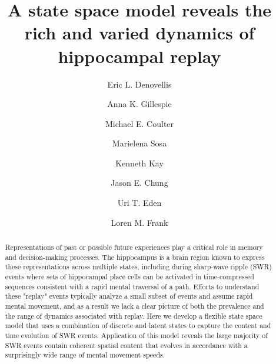 \documentclass[times, twoside]{zHenriquesLab-StyleBioRxiv}
\begin{document}
\title{A state space model reveals the rich and varied dynamics of hippocampal replay}

\author[1]{Eric L. Denovellis}
\author[2, 3]{Anna K. Gillespie}
\author[2, 3]{Michael E. Coulter}
\author[5]{Marielena Sosa}
\author[6]{Kenneth Kay}
\author[7]{Jason E. Chung}
\author[4]{Uri T. Eden}
\author[1, 2, 3, \Letter]{Loren M. Frank}



\maketitle

\begin{abstract}
Representations of past or possible future experiences play a critical role in memory and decision-making processes. The hippocampus is a brain region known to express these representations across multiple states, including during sharp-wave ripple (SWR) events where sets of hippocampal place cells can be activated in time-compressed sequences consistent with a rapid mental traversal of a path. Efforts to understand these "replay" events typically analyze a small subset of events and assume rapid mental movement, and as a result we lack a clear picture of both the prevalence and the range of dynamics associated with replay. Here we develop a flexible state space model that uses a combination of discrete and latent states to capture the content and time evolution of SWR events. Application of this model reveals the large majority of SWR events contain coherent spatial content that evolves in accordance with a surprisingly wide range of mental movement speeds.

\end {abstract}
\end{document}
